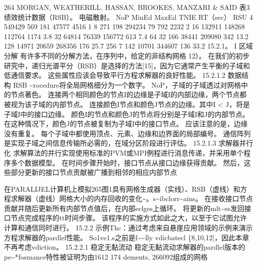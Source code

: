\documentclass[UTF8,11pt,a4paper,openany,fontset=fandol]{ctexbook}
\begin{document}
264 MORGAN, WEATHERILL, HASSAN, BROOKES, MANZARI \& SAID 表3 绩效统计数据（RSB）。 电磁散射。 NoP MinEd MaxEd TNIE RT（sec） RSU 4 549429 569 181 47577 4516 1 8 271 198 294234 79 792 2232 2 16 132911 148268 112764 1174 3.8 32 64814 76339 156772 613 7.4 64 32 166 38441 209080 342 13.2 128 14971 20659 268356 176 25.7 256 7 142 10701 344607 136 33.2 15.2.1。 I 区域分解 有许多不同的分解方法，在序列中，给定的非结构网格 12）。 在我们的初步研究中，递归光谱平分（RSB）是选择的方法[15]，因为它通常产生平衡的子域和低通信要求。 这些属性应该会导致平行方程求解器的良好性能。 15.2.1.2 数据结构 RSB \textasciitilde{}rocedure将全局网格细分为一个数字。 NoP，子域的子域透过对网格中的节点著色。 连接两个相同颜色的节点I的边缘是子域I的内部边缘，两个节点都被视为该子域的内部节点。 连接颜色I节点和颜色J节点的边缘。其中I < J，将是子域I中的接口边缘。 颜色I的节点和颜色J的节点将分别是子域I和J的内部节点。 在这种情况下，颜色J的节点被复制为子域I中的接口节点。 应该注意的是，边缘没有重复。 每个子域中都使用顶点、元素、边缘和边界面的局部编号。 通信阵列是实现子域之间信息传输所必需的，在域分区阶段进行评估。 15.2.1.3 求解器并行化 求解算法的并行实现使用标准的PVM或MPI例程进行消息传递，并采用单个程序多个数据模型。 在时间步骤开始时，接口节点从接口边缘获得贡献。 然后，这些部分更新的接口节点贡献被广播到相邻的相应内部节点

在PARALIJEL计算机上模拟265图1具有网格生成器（实线）、RSB（虚线）和方程求解器（虚线）网格大小的内存回收的变化\textasciitilde{}。s\textasciitilde{}ibclorr\textasciitilde{}ains。 在接收接口节点贡献并随后更新所有内部节点值后，在内部eclges上循环。 将更新的mlt\textasciitilde{}es发回接口节点完成程序的tt时间步骤。 该程序的实施方式如此之大，以至于它试图允许计算和通信同时进行。 15.2.2 示例Thc：通过考虑来自悬崖应用领域的示例来演示方程求解器的pardlel性能。 So1ve1.s之前是f\textasciitilde{}\textasciitilde{}lly vdicbatecl \{8,10,12]，因此本章不再考虑vdiction。 15.2.2.1 稳定无黏流动 稳定无黏流动求解器的pardlel版本的pe\textasciitilde{}*fosmance特性被证明为由1612 174 dements, 266092组成的网格
\end{document}
